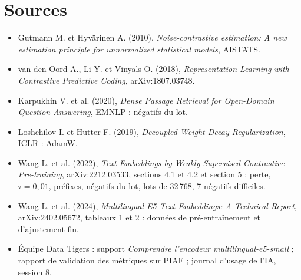 \section{Sources}

\begin{itemize}
\item Gutmann M. et Hyvärinen A. (2010), {\NoAutoSpacing\emph{Noise-contrastive estimation: A new estimation principle for
  unnormalized statistical models}}, AISTATS.
\item van den Oord A., Li Y. et Vinyals O. (2018), \emph{Representation Learning with Contrastive Predictive
  Coding}, {\NoAutoSpacing arXiv:1807.03748}.
\item Karpukhin V. et al. (2020), \emph{Dense Passage Retrieval for Open-Domain Question Answering}, EMNLP :
  négatifs du lot.
\item Loshchilov I. et Hutter F. (2019), \emph{Decoupled Weight Decay Regularization}, ICLR : AdamW.
\item Wang L. et al. (2022), \emph{Text Embeddings by Weakly-Supervised Contrastive Pre-training},
  {\NoAutoSpacing arXiv:2212.03533}, sections 4.1 et 4.2 et section 5 : perte, $\tau = 0{,}01$, préfixes, négatifs du lot, lots de
  32\,768, 7 négatifs difficiles.
\item Wang L. et al. (2024), {\NoAutoSpacing\emph{Multilingual E5 Text Embeddings: A Technical Report}, arXiv:2402.05672},
  tableaux 1 et 2 : données de pré-entraînement et d'ajustement fin.
\item Équipe Data Tigers : support \emph{Comprendre l'encodeur multilingual-e5-small} ; rapport de validation des
  métriques sur PIAF ; journal d'usage de l'IA, session 8.
\end{itemize}



